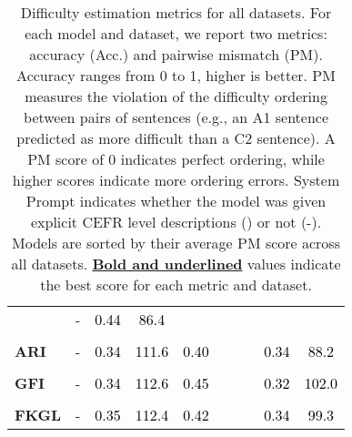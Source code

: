 \begin{table}[!h]
\begin{tabular}{lccccccc}
         & - & \cellcolor[HTML]{8ea5d2}\textcolor{black}{0.44} & \cellcolor[HTML]{c0cce5}\textcolor{black}{86.4} & \cellcolor[HTML]{6382c0}\textcolor{white}{0.61} & \cellcolor[HTML]{1c4aa4}\textcolor{white}{18.3} & \cellcolor[HTML]{3059ac}\textcolor{white}{0.81} & \cellcolor[HTML]{244fa7}\textcolor{white}{21.3} \\
        \\[2pt]
        \textbf{ARI} & - & \cellcolor[HTML]{a8b9dc}\textcolor{black}{0.34} & \cellcolor[HTML]{fcfdfe}\textcolor{black}{111.6} & \cellcolor[HTML]{99add6}\textcolor{black}{0.40} & \cellcolor[HTML]{6281c0}\textcolor{white}{47.1} & \cellcolor[HTML]{a8b9dc}\textcolor{black}{0.34} & \cellcolor[HTML]{c4d0e7}\textcolor{black}{88.2} \\
        \\[2pt]
        \textbf{GFI} & - & \cellcolor[HTML]{a8b9dc}\textcolor{black}{0.34} & \cellcolor[HTML]{ffffff}\textcolor{black}{112.6} & \cellcolor[HTML]{8ca3d1}\textcolor{black}{0.45} & \cellcolor[HTML]{5a7bbd}\textcolor{white}{44.1} & \cellcolor[HTML]{adbdde}\textcolor{black}{0.32} & \cellcolor[HTML]{e5eaf4}\textcolor{black}{102.0} \\
        \\[2pt]
        \textbf{FKGL} & - & \cellcolor[HTML]{a5b7db}\textcolor{black}{0.35} & \cellcolor[HTML]{fefefe}\textcolor{black}{112.4} & \cellcolor[HTML]{93a9d4}\textcolor{black}{0.42} & \cellcolor[HTML]{738fc7}\textcolor{white}{54.5} & \cellcolor[HTML]{a8b9dc}\textcolor{black}{0.34} & \cellcolor[HTML]{dfe5f2}\textcolor{black}{99.3} \\
        \bottomrule
    \end{tabular}
    \caption{Difficulty estimation metrics for all datasets. For each model and dataset, we report two metrics: accuracy (Acc.) and pairwise mismatch (PM). Accuracy ranges from 0 to 1, higher is better. PM measures the violation of the difficulty ordering between pairs of sentences (e.g., an A1 sentence predicted as more difficult than a C2 sentence). A PM score of 0 indicates perfect ordering, while higher scores indicate more ordering errors. System Prompt indicates whether the model was given explicit CEFR level descriptions (\checkmark) or not (-). Models are sorted by their average PM score across all datasets. \textbf{\underline{Bold and underlined}} values indicate the best score for each metric and dataset.}
    \label{tab:difficulty_estimation_metrics}
\end{table}

